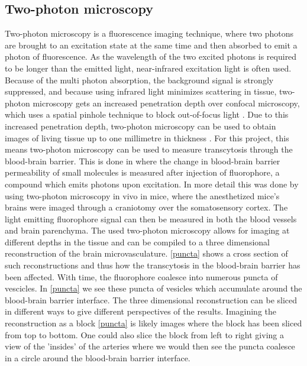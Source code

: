 \subsection{Two-photon microscopy}
Two-photon microscopy is a fluorescence imaging technique, where two photons are brought to an excitation state at the same time and then absorbed to emit a photon of fluorescence. As the wavelength of the two excited photons is required to be longer than the emitted light, near-infrared excitation light is often used. Because of the multi photon absorption, the background signal is strongly suppressed, and because using infrared light minimizes scattering in tissue, two-photon microscopy gets an increased penetration depth over confocal microscopy, which uses a spatial pinhole technique to block out-of-focus light \cite{confocal}. Due to this increased penetration depth, two-photon microscopy can be used to obtain images of living tissue up to one millimetre in thickness \cite{wikimicroscopy}. For this project, this means two-photon microscopy can be used to measure transcytosis through the blood-brain barrier. This is done in \cite{imaging} where the change in blood-brain barrier permeability of small molecules is measured after injection of fluorophore, a compound which emits photons upon excitation. In more detail this was done by using two-photon microscopy in vivo in mice, where the anesthetized mice's brains were imaged through a craniotomy over the somatosensory cortex. The light emitting fluorophore signal can then be measured in both the blood vessels and brain parenchyma. The used two-photon microscopy allows for imaging at different depths in the tissue and can be compiled to a three dimensional reconstruction of the brain microvasculature. \autoref{puncta} shows a cross section of such reconstructions and thus how the transcytosis in the blood-brain barrier has been affected. With time, the fluorophore coalesce into numerous puncta of vescicles. In \autoref{puncta} we see these puncta of vesicles which accumulate around the blood-brain barrier interface. The three dimensional reconstruction can be sliced in different ways to give different perspectives of the results. Imagining the reconstruction as a block \autoref{puncta} is likely images where the block has been sliced from top to bottom. One could also slice the block from left to right giving a view of the 'insides' of the arteries where we would then see the puncta coalesce in a circle around the blood-brain barrier interface. 
